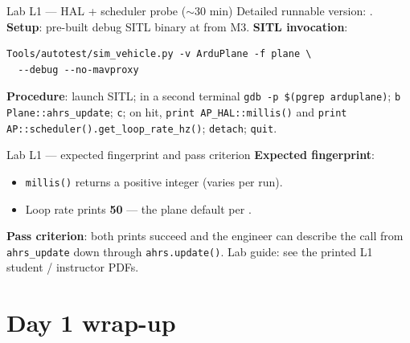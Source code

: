 \documentclass[aspectratio=169,11pt]{beamer}
\begin{document}
\begin{frame}[fragile]{Lab L1 --- HAL + scheduler probe ($\sim$30 min)}
  Detailed runnable version: .
  \vfill
  \textbf{Setup}: pre-built debug SITL binary at  from M3.
  \vfill
  \textbf{SITL invocation}:
  \begin{Verbatim}[fontsize=\small,frame=single]
Tools/autotest/sim_vehicle.py -v ArduPlane -f plane \
  --debug --no-mavproxy
  \end{Verbatim}
  \vfill
  \textbf{Procedure}: launch SITL; in a second terminal \texttt{gdb -p \$(pgrep arduplane)}; \texttt{b Plane::ahrs\_update}; \texttt{c}; on hit, \texttt{print AP\_HAL::millis()} and \texttt{print AP::scheduler().get\_loop\_rate\_hz()}; \texttt{detach}; \texttt{quit}.
\end{frame}

\begin{frame}[allowframebreaks]{Lab L1 --- expected fingerprint and pass criterion}
  \textbf{Expected fingerprint}:
  \begin{itemize}
    \item \texttt{millis()} returns a positive integer (varies per run).
    \item Loop rate prints \textbf{50} --- the plane default per .
  \end{itemize}
  \vfill
  \textbf{Pass criterion}: both prints succeed and the engineer can describe the call from \texttt{ahrs\_update} down through \texttt{ahrs.update()}.
  \vfill
  Lab guide: see the printed L1 student / instructor PDFs.
\end{frame}

\section{Day 1 wrap-up}
\end{document}
